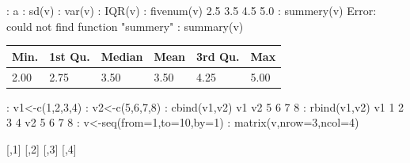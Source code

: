 \documentclass[10pt,a4paper]{article}
\begin{document}
{{: a
\newline
: sd(v)
\newline
: var(v)
\newline
: IQR(v)
\newline
: fivenum(v)
 2.5 3.5 4.5 5.0
\newline
: summery(v)
\newline
Error: could not find function "summery"
\newline
: summary(v)
\newline
\begin{table}[!htbp]
	\begin{center}
		\def\arraystretch{2.0}
		\begin{tabular}{| p{2cm} | p{2cm} | p{2cm} | p{2cm} | p{2cm} | p{2cm}}
			\hline
			Min.	& 1st Qu.	& Median	& Mean	& 3rd Qu. & Max \\
			\hline
			2.00 & 2.75 & 3.50 & 3.50 & 4.25 & 5.00
			\\
			\hline
			
		\end{tabular}
	
		\label{tab:hreq}
	\end{center}	
\end{table}


: v1<-c(1,2,3,4)
\newline
: v2<-c(5,6,7,8)
\newline
: cbind(v1,v2)
\newline
v1 v2
  5
  6
  7
  8
\newline
: rbind(v1,v2)
\newline
[,1] [,2] [,3] [,4]
\newline
v1    1    2    3    4
\newline
v2    5    6    7    8
\newline
: v<-seq(from=1,to=10,by=1)
\newline
: matrix(v,nrow=3,ncol=4)
\newline

     [,1] [,2] [,3] [,4]
\newline
     
}}
\end{document}
